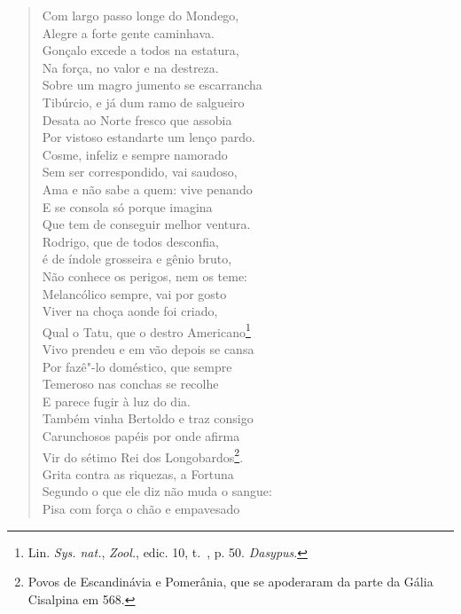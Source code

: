 \begin{verse}

Com largo passo longe do Mondego,\\			\index{\Monde}
Alegre a forte gente caminhava.\\
Gonçalo excede a todos na estatura,\\
Na força, no valor e na destreza.\\
Sobre um magro jumento se escarrancha\\
Tibúrcio, e já dum ramo de salgueiro\\
Desata ao Norte fresco que assobia\\
Por vistoso estandarte um lenço pardo.\\ 
Cosme, infeliz e sempre namorado\\
Sem ser correspondido, vai saudoso,\\
Ama e não sabe a quem: vive penando\\
E se consola só porque imagina\\
Que tem de conseguir melhor ventura.\\ 
Rodrigo, que de todos desconfia,\\
é de índole grosseira e gênio bruto,\\
Não conhece os perigos, nem os teme:\\
Melancólico sempre, vai por gosto\\			\index{\Melanc}
Viver na choça aonde foi criado,\\ 		\index{\Choca}
Qual o Tatu, que o destro Americano\footnote{ Lin. \textit{Sys. nat.}, \textit{Zool.}, edic. 10, t.~, p. 50. \textit{Dasypus}.}\\
Vivo prendeu e em vão depois se cansa\\
Por fazê"-lo doméstico, que sempre\\
Temeroso nas conchas se recolhe\\
E parece fugir à luz do dia.\\ 
Também vinha Bertoldo e traz consigo\\
Carunchosos papéis por onde afirma\\
Vir do sétimo Rei dos Longobardos\footnote{ Povos de Escandinávia e Pomerânia, que se apoderaram 
da parte da Gália Cisalpina em 568.}.\\		\index{\Galia}	\index{\Longob}
Grita contra as riquezas, a Fortuna\\		\index{\Fortu}
Segundo o que ele diz não muda o sangue:\\
Pisa com força o chão e empavesado\\			\index{\Empav}

\end{verse}
